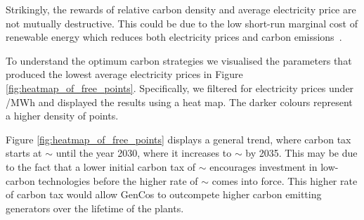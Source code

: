 \documentclass[sigconf]{acmart}
\begin{document}
Strikingly, the rewards of relative carbon density and average electricity price are not mutually destructive. This could be due to the low short-run marginal cost of renewable energy which reduces both electricity prices and carbon emissions~\cite{OMahoney2011}.





To understand the optimum carbon strategies we visualised the parameters that produced the lowest average electricity prices in Figure \ref{fig:heatmap_of_free_points}. Specifically, we filtered for electricity prices under /MWh and displayed the results using a heat map. The darker colours represent a higher density of points. 

Figure \ref{fig:heatmap_of_free_points} displays a general trend, where carbon tax starts at ${\sim}$ until the year 2030, where it increases to ${\sim}$ by 2035. This may be due to the fact that a lower initial carbon tax of ${\sim}$ encourages investment in low-carbon technologies  before the higher rate of ${\sim}$ comes into force. This higher rate of carbon tax would allow GenCos to outcompete higher carbon emitting generators over the lifetime of the plants.





\end{document}
